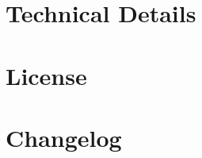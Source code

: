 \documentclass[a4paper,DIV=calc]{scrartcl}
\begin{document}
\section{Technical Details}

\section{License}

\section{Changelog}
\end{document}

